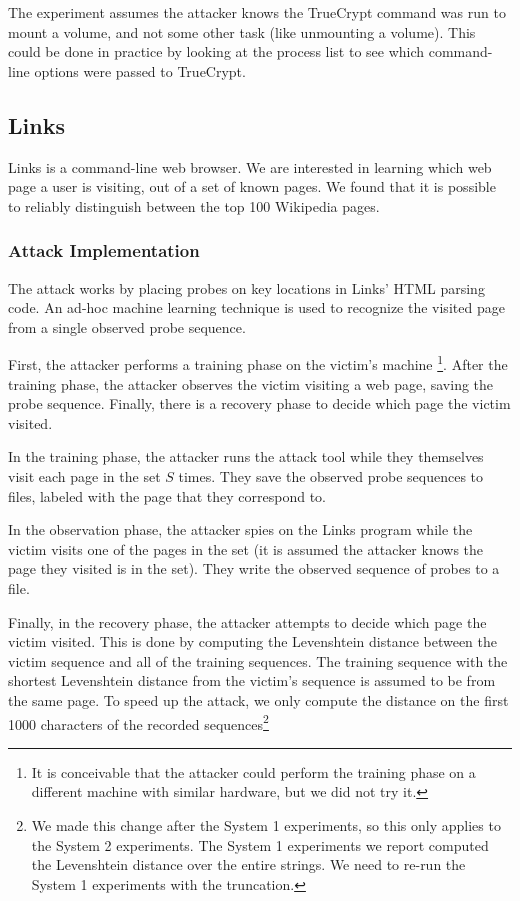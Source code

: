 \documentclass{acm_proc_article-sp}
\begin{document}
The experiment assumes the attacker knows the TrueCrypt command was run to mount
a volume, and not some other task (like unmounting a volume). This could be done
in practice by looking at the process list to see which command-line options
were passed to TrueCrypt.

\subsection{Links}

Links is a command-line web browser. We are interested in learning which web
page a user is visiting, out of a set of known pages. We found that it is
possible to reliably distinguish between the top 100 Wikipedia pages.

\subsubsection{Attack Implementation}

The attack works by placing probes on key locations in Links' HTML parsing code.
An ad-hoc machine learning technique is used to recognize the visited page from
a single observed probe sequence.

First, the attacker performs a training phase on the victim's machine
\footnote{It is conceivable that the attacker could perform the training phase
on a different machine with similar hardware, but we did not try it.}. After the
training phase, the attacker observes the victim visiting a web page, saving the
probe sequence. Finally, there is a recovery phase to decide which page the
victim visited.

In the training phase, the attacker runs the attack tool while they themselves
visit each page in the set $S$ times. They save the observed probe sequences to
files, labeled with the page that they correspond to.

In the observation phase, the attacker spies on the Links program while the
victim visits one of the pages in the set (it is assumed the attacker knows the
page they visited is in the set). They write the observed sequence of probes to
a file.

Finally, in the recovery phase, the attacker attempts to decide which page the
victim visited. This is done by computing the Levenshtein distance
\cite{levenshtein1966binary} between the victim sequence and all of the training
sequences. The training sequence with the shortest Levenshtein distance from the
victim's sequence is assumed to be from the same page. To speed up the attack,
we only compute the distance on the first 1000 characters of the recorded
sequences\footnote{We made this change after the System 1 experiments, so this
only applies to the System 2 experiments. The System 1 experiments we report
computed the Levenshtein distance over the entire strings. We need to re-run the
System 1 experiments with the truncation.}
\end{document}

